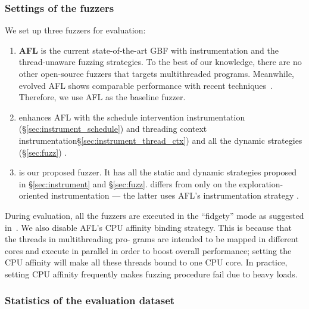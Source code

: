 \subsubsection{Settings of the fuzzers}
We set up three fuzzers for evaluation:
\begin{enumerate}[1)]
\item \textbf{AFL} is the current state-of-the-art GBF with \AFLIns instrumentation 
and the thread-unaware fuzzing strategies. To the best of our knowledge, there are no 
other open-source fuzzers that targets multithreaded programs. Meanwhile, evolved AFL 
shows comparable performance with recent techniques~\cite{ccs18_eval_fuzzing,Shastry:LNCS2017:Orthrus}. 
Therefore, we use AFL as the baseline fuzzer.

\item \textbf{\mtfuzzc} enhances AFL with the schedule intervention instrumentation 
(\S\ref{sec:instrument_schedule}) and threading context instrumentation\S\ref{sec:instrument_thread_ctx}) and all the dynamic strategies (\S\ref{sec:fuzz}) .

\item \textbf{\mtfuzz} is our proposed fuzzer. It has all the static and dynamic 
strategies proposed in \S\ref{sec:instrument} and \S\ref{sec:fuzz}. \mtfuzz differs
from \mtfuzzc only on the exploration-oriented instrumentation --- the latter uses AFL's instrumentation strategy \AFLIns.
\end{enumerate}

During evaluation, all the fuzzers are executed in the ``fidgety'' mode as
suggested in~\cite{FidgetyAFL}. We also disable AFL's CPU affinity binding
strategy. This is because that the threads in multithreading pro-
grams are intended to be mapped in different cores and execute in
parallel in order to boost overall performance; setting the CPU affinity will make all these threads bound to one CPU core. In practice, setting CPU affinity frequently makes fuzzing procedure fail due to heavy loads.



\subsubsection{Statistics of the evaluation dataset}

